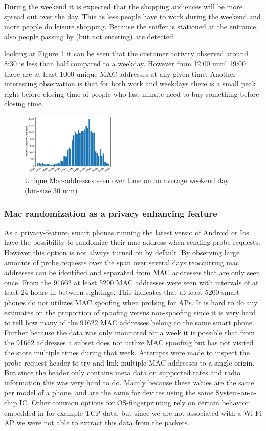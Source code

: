 \documentclass[conference,compsoc]{IEEEtran}
\begin{document}
During the weekend it is expected that the shopping audiences will be more spread out over the day. This as less people have to work during the weekend and more people do leisure shopping. Because the sniffer is stationed at the entrance, also people passing by (but not entering) are detected.

looking at Figure \ref{fig:SaturdayHist} it can be seen that the customer activity observed around 8:30 is less than half compared to a weekday. However from 12:00 until 19:00 there are at least 1000 unique MAC addresses at any given time. Another interesting observation is that for both work and weekdays there is a small peak right before closing time of people who last minute need to buy something before closing time. 
\begin{figure}[h!]
    \centering
    \includegraphics[width=0.4\textwidth]{img/daySat.png} 
    \caption{Unique Mac-addresses seen over time on an average weekend day (bin-size 30 min)}
    \label{fig:SaturdayHist}
\end{figure}

\subsubsection{Mac randomization as a privacy enhancing feature}
As a privacy-feature, smart phones running the latest versio of Android or Ios have the possibility to randomize their mac address when sending probe requests. However this option is not always turned on by default. By observing large amounts of probe requests over the span over several days reoccurring mac addresses can be identified and separated from MAC addresses that are only seen once. From the 91662 at least 5200 MAC addresses were seen with intervals of at least 24 hours in between sightings. This indicates that at least 5200 smart phones do not utilizes MAC spoofing when probing for APs. It is hard to do any estimates on the proportion of spoofing versus non-spoofing since it is very hard to tell how many of the 91622 MAC addresses belong to the same smart phone. Further because the data was only monitored for a week it is possible that from the 91662 addresses a subset does not utilize MAC spoofing but has not visited the store multiple times during that week. 
Attempts were made to inspect the probe request header to try and link multiple MAC addresses to a single origin. But since the header only contains meta data on supported rates and radio information this was very hard to do. Mainly because these values are the same per model of a phone, and are the same for devices using the same System-on-a-chip IC. Other common options for OS-fingerprinting rely on certain behavior embedded in for example TCP data, but since we are not associated with a Wi-Fi AP we were not able to extract this data from the packets.
\end{document}
